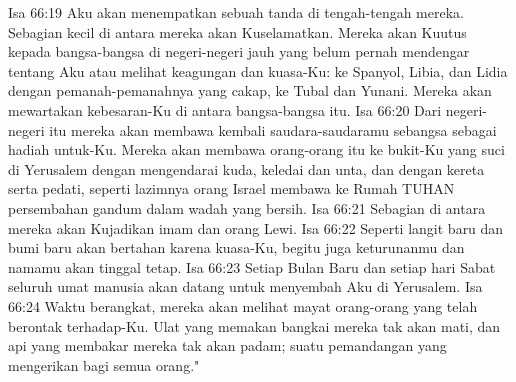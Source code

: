 Isa 66:19  Aku akan menempatkan sebuah tanda di tengah-tengah mereka. Sebagian kecil di antara mereka akan Kuselamatkan. Mereka akan Kuutus kepada bangsa-bangsa di negeri-negeri jauh yang belum pernah mendengar tentang Aku atau melihat keagungan dan kuasa-Ku: ke Spanyol, Libia, dan Lidia dengan pemanah-pemanahnya yang cakap, ke Tubal dan Yunani. Mereka akan mewartakan kebesaran-Ku di antara bangsa-bangsa itu.
Isa 66:20  Dari negeri-negeri itu mereka akan membawa kembali saudara-saudaramu sebangsa sebagai hadiah untuk-Ku. Mereka akan membawa orang-orang itu ke bukit-Ku yang suci di Yerusalem dengan mengendarai kuda, keledai dan unta, dan dengan kereta serta pedati, seperti lazimnya orang Israel membawa ke Rumah TUHAN persembahan gandum dalam wadah yang bersih.
Isa 66:21  Sebagian di antara mereka akan Kujadikan imam dan orang Lewi.
Isa 66:22  Seperti langit baru dan bumi baru akan bertahan karena kuasa-Ku, begitu juga keturunanmu dan namamu akan tinggal tetap.
Isa 66:23  Setiap Bulan Baru dan setiap hari Sabat seluruh umat manusia akan datang untuk menyembah Aku di Yerusalem.
Isa 66:24  Waktu berangkat, mereka akan melihat mayat orang-orang yang telah berontak terhadap-Ku. Ulat yang memakan bangkai mereka tak akan mati, dan api yang membakar mereka tak akan padam; suatu pemandangan yang mengerikan bagi semua orang."


